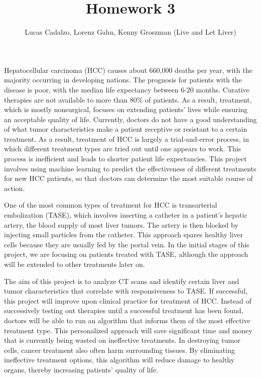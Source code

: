 \documentclass[11pt, oneside]{article}   	%
\title{Homework 3}
\author{Lucas Cadalzo, Lorenz Gahn, Kenny Groszman (Live and Let Liver)}
\date{}							%
\begin{document}
\maketitle

Hepatocellular carcinoma (HCC) causes about 660,000 deaths per year, with the majority occurring in developing nations. The prognosis for patients with the disease is poor, with the median life expectancy between 6-20 months. Curative therapies are not available to more than 80\% of patients. As a result, treatment, which is mostly nonsurgical, focuses on extending patients' lives while ensuring an acceptable quality of life. Currently, doctors do not have a good understanding of what tumor characteristics make a patient receptive or resistant to a certain treatment. As a result, treatment of HCC is largely a trial-and-error process, in which different treatment types are tried out until one appears to work. This process is inefficient and leads to shorter patient life expectancies. This project involves using machine learning to predict the effectiveness of different treatments for new HCC patients, so that doctors can determine the most suitable course of action. \par
One of the most common types of treatment for HCC is transarterial embolization (TASE), which involves inserting a catheter in a patient's hepatic artery, the blood supply of most liver tumors. The artery is then blocked by injecting small particles from the catheter. This approach spares healthy liver cells because they are usually fed by the portal vein. In the initial stages of this project, we are focusing on patients treated with TASE, although the approach will be extended to other treatments later on. \par
The aim of this project is to analyze CT scans and identify certain liver and tumor characteristics that correlate with responsiveness to TASE. If successful, this project will improve upon clinical practice for treatment of HCC. Instead of successively testing out therapies until a successful treatment has been found, doctors will be able to run an algorithm that informs them of the most effective treatment type. This personalized approach will save significant time and money that is currently being wasted on ineffective treatments. In destroying tumor cells, cancer treatment also often harm surrounding tissues. By eliminating ineffective treatment options, this algorithm will reduce damage to healthy organs, thereby increasing patients' quality of life. 
\end{document}
